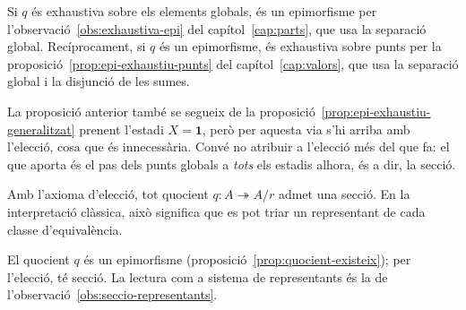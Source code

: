 \begin{prova}
Si \(q\) és exhaustiva sobre els elements globals, és un epimorfisme per l'observació~\ref{obs:exhaustiva-epi} del capítol~\ref{cap:parts}, que usa la separació global. Recíprocament, si \(q\) és un epimorfisme, és exhaustiva sobre punts per la proposició~\ref{prop:epi-exhaustiu-punts} del capítol~\ref{cap:valors}, que usa la separació global i la disjunció de les sumes.
\end{prova}

\begin{observacio}\label{obs:eleccio-no-afegeix}
La proposició anterior també se segueix de la proposició~\ref{prop:epi-exhaustiu-generalitzat} prenent l'estadi \(X=\mathbf1\), però per aquesta via s'hi arriba amb l'elecció, cosa que és innecessària. Convé no atribuir a l'elecció més del que fa: el que aporta és el pas dels punts globals a \emph{tots} els estadis alhora, és a dir, la secció.
\end{observacio}

\begin{proposicio}\label{prop:representants}
Amb l'axioma d'elecció, tot quocient \(q\colon A\twoheadrightarrow A/r\) admet una secció. En la interpretació clàssica, això significa que es pot triar un representant de cada classe d'equivalència.
\end{proposicio}

\begin{prova}
El quocient \(q\) és un epimorfisme (proposició~\ref{prop:quocient-existeix}); per l'elecció, té secció. La lectura com a sistema de representants és la de l'observació~\ref{obs:seccio-representants}.
\end{prova}

